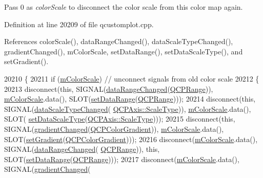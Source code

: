 Pass 0 as {\itshape color\+Scale} to disconnect the color scale from this color map again. 

Definition at line 20209 of file qcustomplot.\+cpp.



References color\+Scale(), data\+Range\+Changed(), data\+Scale\+Type\+Changed(), gradient\+Changed(), m\+Color\+Scale, set\+Data\+Range(), set\+Data\+Scale\+Type(), and set\+Gradient().


\begin{DoxyCode}
20210 \{
20211   \textcolor{keywordflow}{if} (\hyperlink{class_q_c_p_color_map_a95b4100bacc3387652c988b071ec9db7}{mColorScale}) \textcolor{comment}{// unconnect signals from old color scale}
20212   \{
20213     disconnect(\textcolor{keyword}{this}, SIGNAL(\hyperlink{class_q_c_p_color_map_a482980f2335d09cfb36dd95ba9663197}{dataRangeChanged}(\hyperlink{class_q_c_p_range}{QCPRange})), 
      \hyperlink{class_q_c_p_color_map_a95b4100bacc3387652c988b071ec9db7}{mColorScale}.data(), SLOT(\hyperlink{class_q_c_p_color_map_a980b42837821159786a85b4b7dcb8774}{setDataRange}(\hyperlink{class_q_c_p_range}{QCPRange})));
20214     disconnect(\textcolor{keyword}{this}, SIGNAL(\hyperlink{class_q_c_p_color_map_a978d5d5c9f68cffef8c902b855c04490}{dataScaleTypeChanged}(
      \hyperlink{class_q_c_p_axis_a36d8e8658dbaa179bf2aeb973db2d6f0}{QCPAxis::ScaleType})), \hyperlink{class_q_c_p_color_map_a95b4100bacc3387652c988b071ec9db7}{mColorScale}.data(), SLOT(
      \hyperlink{class_q_c_p_color_map_a9d20aa08e3c1f20f22908c45b9c06511}{setDataScaleType}(\hyperlink{class_q_c_p_axis_a36d8e8658dbaa179bf2aeb973db2d6f0}{QCPAxis::ScaleType})));
20215     disconnect(\textcolor{keyword}{this}, SIGNAL(\hyperlink{class_q_c_p_color_map_abf4797f86e422ac6e0f732c4ff1a4d49}{gradientChanged}(\hyperlink{class_q_c_p_color_gradient}{QCPColorGradient})), 
      \hyperlink{class_q_c_p_color_map_a95b4100bacc3387652c988b071ec9db7}{mColorScale}.data(), SLOT(\hyperlink{class_q_c_p_color_map_a7313c78360471cead3576341a2c50377}{setGradient}(\hyperlink{class_q_c_p_color_gradient}{QCPColorGradient})));
20216     disconnect(\hyperlink{class_q_c_p_color_map_a95b4100bacc3387652c988b071ec9db7}{mColorScale}.data(), SIGNAL(\hyperlink{class_q_c_p_color_map_a482980f2335d09cfb36dd95ba9663197}{dataRangeChanged}(
      \hyperlink{class_q_c_p_range}{QCPRange})), \textcolor{keyword}{this}, SLOT(\hyperlink{class_q_c_p_color_map_a980b42837821159786a85b4b7dcb8774}{setDataRange}(\hyperlink{class_q_c_p_range}{QCPRange})));
20217     disconnect(\hyperlink{class_q_c_p_color_map_a95b4100bacc3387652c988b071ec9db7}{mColorScale}.data(), SIGNAL(\hyperlink{class_q_c_p_color_map_abf4797f86e422ac6e0f732c4ff1a4d49}{gradientChanged}(

\end{DoxyCode}
